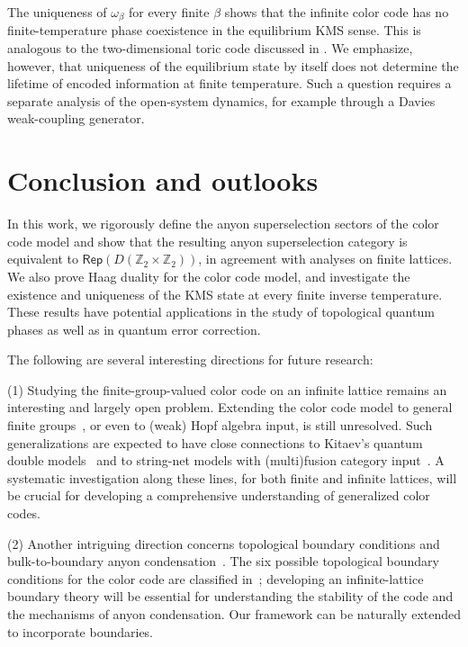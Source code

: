 \documentclass[a4paper,11pt]{article}
\theoremstyle{definition}
\theoremstyle{remark}
\theoremstyle{remark}
\begin{document}
The uniqueness of $\omega_\beta$ for every finite $\beta$ shows that the infinite color code has no finite-temperature phase coexistence in the equilibrium KMS sense. This is analogous to the two-dimensional toric code discussed in \cite{alicki2007statistical}. We emphasize, however, that uniqueness of the equilibrium state by itself does not determine the lifetime of encoded information at finite temperature. Such a question requires a separate analysis of the open-system dynamics, for example through a Davies weak-coupling generator.




\section{Conclusion and outlooks}

In this work, we rigorously define the anyon superselection sectors of the color code model and show that the resulting anyon superselection category is equivalent to $\mathsf{Rep}(D(\mathbb{Z}_2 \times \mathbb{Z}_2))$, in agreement with analyses on finite lattices.  
We also prove Haag duality for the color code model, and investigate the existence and uniqueness of the KMS state at every finite inverse temperature.  
These results have potential applications in the study of topological quantum phases as well as in quantum error correction.

The following are several interesting directions for future research:  

(1) Studying the finite-group-valued color code on an infinite lattice remains an interesting and largely open problem.  
Extending the color code model to general finite groups~\cite{Brell2015colorcode}, or even to (weak) Hopf algebra input, is still unresolved.  
Such generalizations are expected to have close connections to Kitaev's quantum double models~\cite{Kitaev2003,Buerschaper2013a,jia2023boundary,Jia2023weak,jia2022electricmagnetic,jia2024generalized,jia2024weakhopf,bols2025classification,Cha2018infinite} and to string-net models with (multi)fusion category input~\cite{Levin2005,Hu2018full,jia2024weakTube,jia2025tube,bols2025sector}.  
A systematic investigation along these lines, for both finite and infinite lattices, will be crucial for developing a comprehensive understanding of generalized color codes.  

(2) Another intriguing direction concerns topological boundary conditions and bulk-to-boundary anyon condensation~\cite{wallick2023algebraic,jones2025local,Ogata2024boundary}.  
The six possible topological boundary conditions for the color code are classified in~\cite{kesselring2024anyon}; developing an infinite-lattice boundary theory will be essential for understanding the stability of the code and the mechanisms of anyon condensation.  
Our framework can be naturally extended to incorporate boundaries.  
\end{document}
